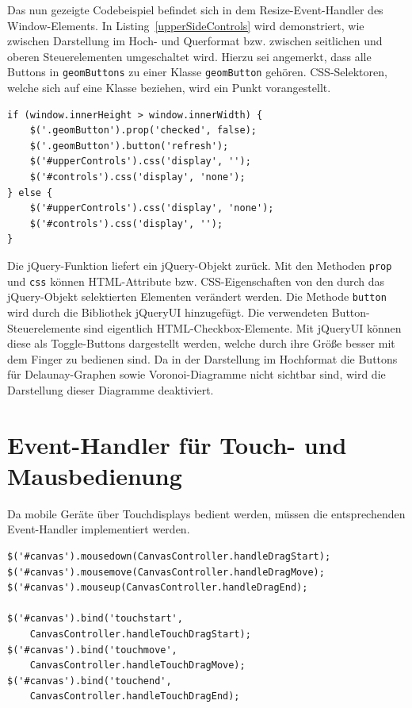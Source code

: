 Das nun gezeigte Codebeispiel befindet sich in dem Resize-Event-Handler des Window-Elements. In Listing~\ref{upperSideControls} wird demonstriert, wie zwischen Darstellung im Hoch- und Querformat bzw. zwischen seitlichen und oberen Steuerelementen umgeschaltet wird. Hierzu sei angemerkt, dass alle Buttons in \verb+geomButtons+ zu einer Klasse \verb+geomButton+ gehören. CSS-Selektoren, welche sich auf eine Klasse beziehen, wird ein Punkt vorangestellt.

\begin{lstlisting}[float = htbp, caption={Umstellen zwischen Hoch- und Querformat},label=upperSideControls]
if (window.innerHeight > window.innerWidth) {
	$('.geomButton').prop('checked', false);
	$('.geomButton').button('refresh');
	$('#upperControls').css('display', '');
	$('#controls').css('display', 'none');
} else {
	$('#upperControls').css('display', 'none');
	$('#controls').css('display', '');        
}
\end{lstlisting}

Die jQuery-Funktion liefert ein jQuery-Objekt zurück. Mit den Methoden \verb+prop+ und \verb+css+ können HTML-Attribute bzw. CSS-Eigenschaften von den durch das jQuery-Objekt selektierten Elementen verändert werden. Die Methode \verb+button+ wird durch die Bibliothek jQueryUI hinzugefügt. Die verwendeten Button-Steuer\-elemente sind eigentlich HTML-Checkbox-Elemente. Mit jQueryUI können diese als Toggle-Buttons dargestellt werden, welche durch ihre Größe besser mit dem Finger zu bedienen sind. Da in der Darstellung im Hochformat die Buttons für Delaunay-Graphen sowie Voronoi-Diagramme nicht sichtbar sind, wird die Darstellung dieser Diagramme deaktiviert.

\section*{Event-Handler für Touch- und Mausbedienung}

Da mobile Geräte über Touchdisplays bedient werden, müssen die entsprechenden Event-Handler implementiert werden.

\begin{lstlisting}[float = htbp, caption={Zuweisen der Event-Handler an das Canvas-Element},label=canvasEvents]
$('#canvas').mousedown(CanvasController.handleDragStart);
$('#canvas').mousemove(CanvasController.handleDragMove);
$('#canvas').mouseup(CanvasController.handleDragEnd);

$('#canvas').bind('touchstart',
	CanvasController.handleTouchDragStart);
$('#canvas').bind('touchmove',
	CanvasController.handleTouchDragMove);
$('#canvas').bind('touchend',
	CanvasController.handleTouchDragEnd);
\end{lstlisting}

